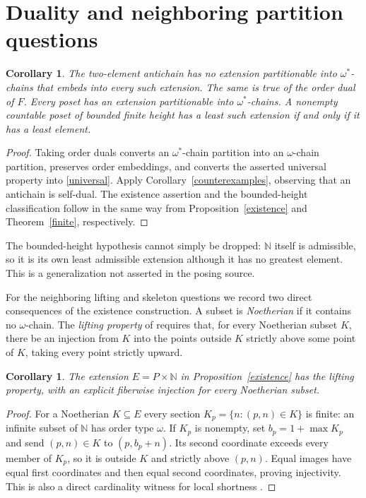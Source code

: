 \documentclass[11pt]{article}
\newtheorem{corollary}[theorem]{Corollary}
\newcommand{\N}{\mathbb N}
\begin{document}
\section{Duality and neighboring partition questions}
\begin{corollary}\label{dual}
The two-element antichain has no extension partitionable into
$\omega^*$-chains that embeds into every such extension. The same is true
of the order dual of $F$. Every poset has an extension partitionable into
$\omega^*$-chains. A nonempty countable poset of bounded finite height has a least such extension if
and only if it has a least element.
\end{corollary}
\begin{proof}
Taking order duals converts an $\omega^*$-chain partition into an
$\omega$-chain partition, preserves order embeddings, and converts the
asserted universal property into \eqref{universal}. Apply
Corollary~\ref{counterexamples}, observing that an antichain is self-dual.
The existence assertion and the bounded-height classification follow in the same way
from Proposition~\ref{existence} and Theorem~\ref{finite}, respectively.
\end{proof}

The bounded-height hypothesis cannot simply be dropped: $\N$ itself is
admissible, so it is its own least admissible extension although it has no
greatest element. This is a generalization not asserted in the posing source.

For the neighboring lifting and skeleton questions we record two direct
consequences of the existence construction. A subset is \emph{Noetherian}
if it contains no $\omega$-chain. The \emph{lifting property} of
\cite[Definition 2.26]{salinas} requires that, for every Noetherian subset
$K$, there be an injection from $K$ into the points outside $K$ strictly
above some point of $K$, taking every point strictly upward.

\begin{corollary}\label{lifting}
The extension $E=P\times\N$ in Proposition~\ref{existence} has the lifting
property, with an explicit fiberwise injection for every Noetherian subset.
\end{corollary}
\begin{proof}
For a Noetherian $K\subseteq E$ every section
$K_p=\{n:(p,n)\in K\}$ is finite: an infinite subset of $\N$ has order
type $\omega$. If $K_p$ is nonempty, set $b_p=1+\max K_p$ and send
$(p,n)\in K$ to $(p,b_p+n)$. Its second coordinate exceeds every member
of $K_p$, so it is outside $K$ and strictly above $(p,n)$. Equal images
have equal first coordinates and then equal second coordinates, proving
injectivity. This is also a direct cardinality witness for local shortness
\cite[Definition 2.14]{salinas}.
\end{proof}
\end{document}
